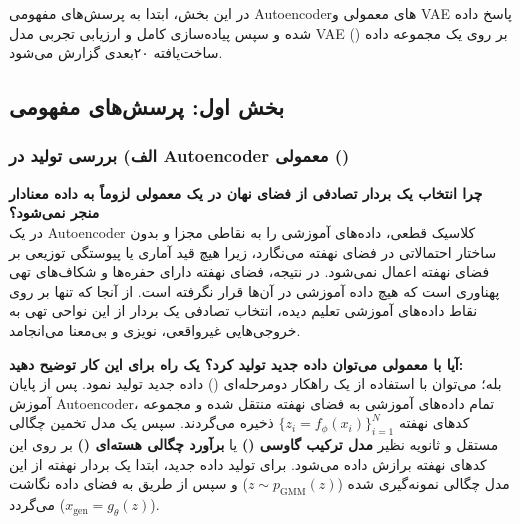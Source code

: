 \label{sec:question2}

در این بخش، ابتدا به پرسش‌های مفهومی Autoencoderهای معمولی و VAE پاسخ داده شده و سپس پیاده‌سازی کامل و ارزیابی تجربی مدل VAE () بر روی یک مجموعه داده ساخت‌یافته ۲۰‌بعدی گزارش می‌شود.

\subsection{بخش اول: پرسش‌های مفهومی}
\label{sec:q2-conceptual}

\subsubsection{الف) بررسی تولید در Autoencoder معمولی ()}
\textbf{چرا انتخاب یک بردار تصادفی از فضای نهان در یک  معمولی لزوماً به داده معنادار منجر نمی‌شود؟} \\
در یک Autoencoder کلاسیک قطعی،  داده‌های آموزشی را به نقاطی مجزا و بدون ساختار احتمالاتی در فضای نهفته می‌نگارد، زیرا هیچ قید آماری یا پیوستگی توزیعی بر فضای نهفته اعمال نمی‌شود. در نتیجه، فضای نهفته دارای حفره‌ها و شکاف‌های تهی پهناوری است که هیچ داده آموزشی در آن‌ها قرار نگرفته است. از آنجا که  تنها بر روی نقاط داده‌های آموزشی تعلیم دیده، انتخاب تصادفی یک بردار از این نواحی تهی به خروجی‌هایی غیرواقعی، نویزی و بی‌معنا می‌انجامد.

\textbf{آیا با  معمولی می‌توان داده جدید تولید کرد؟ یک راه برای این کار توضیح دهید:} \\
بله؛ می‌توان با استفاده از یک راهکار دومرحله‌ای () داده جدید تولید نمود. پس از پایان آموزش Autoencoder، تمام داده‌های آموزشی به فضای نهفته منتقل شده و مجموعه کدهای نهفته $\{z_i = f_\phi(x_i)\}_{i=1}^N$ ذخیره می‌گردند. سپس یک مدل تخمین چگالی مستقل و ثانویه نظیر \textbf{مدل ترکیب گاوسی ()} یا \textbf{برآورد چگالی هسته‌ای ()} بر روی این کدهای نهفته برازش داده می‌شود. برای تولید داده جدید، ابتدا یک بردار نهفته از این مدل چگالی نمونه‌گیری شده ($z \sim p_{\text{GMM}}(z)$) و سپس از طریق  به فضای داده نگاشت می‌گردد ($x_{\text{gen}} = g_\theta(z)$).

